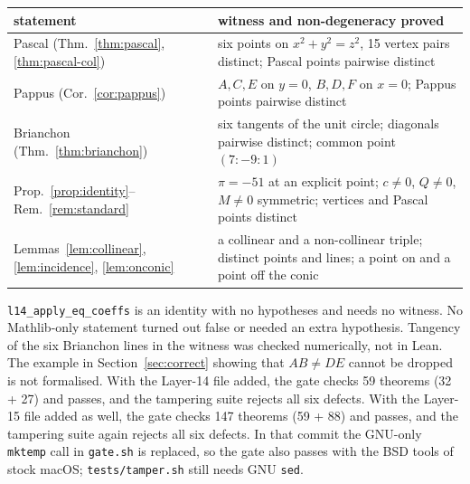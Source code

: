 \documentclass[11pt]{article}
\theoremstyle{remark}
\newcommand{\lean}[1]{\texttt{#1}}
\begin{document}
\begin{center}\footnotesize
\begin{tabular}{@{}lp{}@{}}
\toprule
statement & witness and non-degeneracy proved\\
\midrule
Pascal (Thm.~\ref{thm:pascal}, \ref{thm:pascal-col}) & six points on $x^2+y^2=z^2$, 15 vertex pairs distinct; Pascal points pairwise distinct\\
Pappus (Cor.~\ref{cor:pappus}) & $A,C,E$ on $y=0$, $B,D,F$ on $x=0$; Pappus points pairwise distinct\\
Brianchon (Thm.~\ref{thm:brianchon}) & six tangents of the unit circle; diagonals pairwise distinct; common point $(7:-9:1)$\\
Prop.~\ref{prop:identity}--Rem.~\ref{rem:standard} & $\pi=-51$ at an explicit point; $c\ne0$, $Q\ne0$, $M\ne0$ symmetric; vertices and Pascal points distinct\\
Lemmas~\ref{lem:collinear}, \ref{lem:incidence}, \ref{lem:onconic} & a collinear and a non-collinear triple; distinct points and lines; a point on and a point off the conic\\
\bottomrule
\end{tabular}
\end{center}
\lean{l14\_apply\_eq\_coeffs} is an identity with no hypotheses and needs no witness. No
Mathlib-only statement turned out false or needed an extra hypothesis. Tangency of the six Brianchon
lines in the witness was checked numerically, not in Lean. The example in Section~\ref{sec:correct}
showing that $AB\ne DE$ cannot be dropped is not formalised. With the Layer-14 file added, the gate
checks 59 theorems (32 + 27) and passes, and the tampering suite rejects all six defects.
With the Layer-15 file added as well, the gate checks 147 theorems (59 + 88) and passes, and the
tampering suite again rejects all six defects. In that commit the GNU-only \texttt{mktemp} call in
\texttt{gate.sh} is replaced, so the gate also passes with the BSD tools of stock macOS;
\texttt{tests/tamper.sh} still needs GNU \texttt{sed}.
\end{document}
